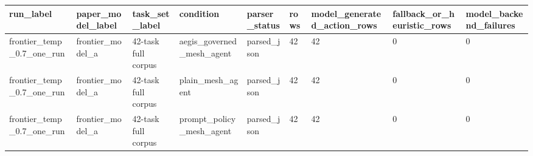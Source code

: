 \begin{tabular}{lllllllll}
 \hline
run\_label & paper\_model\_label & task\_set\_label & condition & parser\_status & rows & model\_generated\_action\_rows & fallback\_or\_heuristic\_rows & model\_backend\_failures \\
 \hline
frontier\_temp\_0.7\_one\_run & frontier\_model\_a & 42-task full corpus & aegis\_governed\_mesh\_agent & parsed\_json & 42 & 42 & 0 & 0 \\
frontier\_temp\_0.7\_one\_run & frontier\_model\_a & 42-task full corpus & plain\_mesh\_agent & parsed\_json & 42 & 42 & 0 & 0 \\
frontier\_temp\_0.7\_one\_run & frontier\_model\_a & 42-task full corpus & prompt\_policy\_mesh\_agent & parsed\_json & 42 & 42 & 0 & 0 \\
 \hline
\end{tabular}
